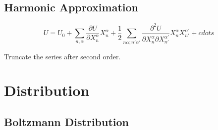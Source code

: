 \subsection{Harmonic Approximation}
\[
    U = U_0 + \sum_{n, \alpha} \frac{\partial U}{\partial X_n^\alpha} X_n^\alpha + \frac{1}{2}\sum_{n \alpha; n' \alpha'}\frac{\partial^2U}{\partial X_n^\alpha \partial X_{n'}^{\alpha'}}X_n^\alpha X_{n'}^{\alpha'} + cdots
\]

Truncate the series after second order.



\section{Distribution}



\subsection{Boltzmann Distribution}
